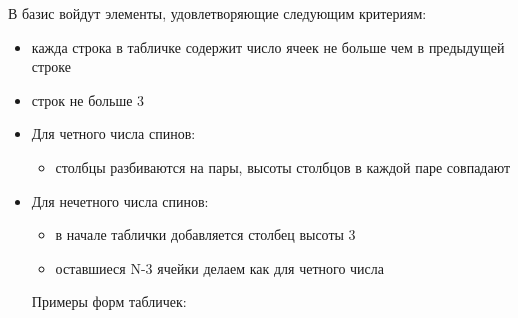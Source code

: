 \documentclass[]{article}
\begin{document}
В базис войдут элементы, удовлетворяющие следующим критериям:
\begin{itemize}
	\item кажда строка в табличке содержит число ячеек не больше чем в предыдущей строке
	\item строк не больше 3
	\item Для четного числа спинов:
	\begin{itemize}
		\item столбцы разбиваются на пары, высоты столбцов в каждой паре совпадают
	\end{itemize}
	\item Для нечетного числа спинов:
	\begin{itemize}
		\item в начале таблички добавляется столбец высоты 3
		\item оставшиеся N-3 ячейки делаем как для четного числа
	\end{itemize}
	Примеры форм табличек:
	

\end{itemize}
\end{document}
